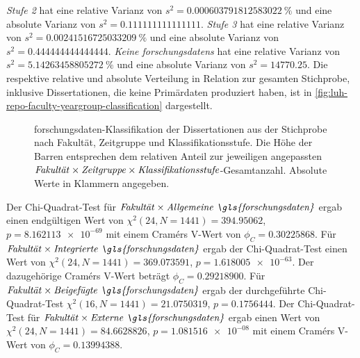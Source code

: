 \textit{Stufe 2} hat eine relative Varianz von $s^2=\SI[round-mode=places,round-precision=3]{0.000603791812583022}{\percent}$ und eine absolute Varianz von $s^2=\num[round-mode=places,round-precision=3]{0.111111111111111}$.
\textit{Stufe 3} hat eine relative Varianz von $s^2=\SI[round-mode=places,round-precision=3]{0.00241516725033209}{\percent}$ und eine absolute Varianz von $s^2=\num[round-mode=places,round-precision=3]{0.444444444444444}$.
\textit{Keine \glspl{forschungsdaten}} hat eine relative Varianz von $s^2=\SI[round-mode=places,round-precision=3]{5.14263458805272}{\percent}$ und eine absolute Varianz von $s^2=\num[round-mode=places,round-precision=3]{14770.25}$.
%
Die respektive relative und absolute Verteilung in Relation zur gesamten Stichprobe, inklusive Dissertationen, die keine Primärdaten produziert haben, ist in \cref{fig:luh-repo-faculty-yeargroup-classification} dargestellt.
\begin{figure}[!htbp]
    \resizebox{\ifdim\width>\textwidth\textwidth\else\width\fi}{!}{}
    \caption{\gls{forschungsdaten}-Klassifikation der Dissertationen aus der Stichprobe nach Fakultät, Zeitgruppe und Klassifikationsstufe.
    Die Höhe der Barren entsprechen dem relativen Anteil zur jeweiligen angepassten $\text{\textit{Fakultät}}\times\text{\textit{Zeitgruppe}}\times\text{\textit{Klassifikationsstufe}}$-Gesamtanzahl.
    Absolute Werte in Klammern angegeben.}
    \label{fig:luh-repo-faculty-yeargroup-classification-adjusted}
\end{figure}

Der Chi-Quadrat-Test für $\text{\textit{Fakultät}}\times\text{\textit{Allgemeine \gls{forschungsdaten}}}$ ergab einen endgültigen Wert von $\chi^2 (\num{24}, N = \num{1441}) = \num[round-mode=places,round-precision=3]{394.95062}$, $p = \num[round-mode=places,round-precision=3]{8.162113e-69}$ mit einem Cramérs V-Wert von $\phi_C=\num[round-mode=places,round-precision=3]{0.30225868}$.
Für $\text{\textit{Fakultät}}\times\text{\textit{Integrierte \gls{forschungsdaten}}}$ ergab der Chi-Quadrat-Test einen Wert von $\chi^2 (\num{24}, N = \num{1441}) = \num[round-mode=places,round-precision=3]{369.073591}$, $p = \num[round-mode=places,round-precision=3]{1.618005e-63}$.
Der dazugehörige Cramérs V-Wert beträgt $\phi_C=\num[round-mode=places,round-precision=3]{0.29218900}$.
Für $\text{\textit{Fakultät}}\times\text{\textit{Beigefügte \gls{forschungsdaten}}}$ ergab der durchgeführte Chi-Quadrat-Test $\chi^2 (\num{16}, N = \num{1441}) = \num[round-mode=places,round-precision=3]{21.0750319}$, $p = \num[round-mode=places,round-precision=3]{0.1756444}$.
Der Chi-Quadrat-Test für $\text{\textit{Fakultät}}\times\text{\textit{Externe \gls{forschungsdaten}}}$ ergab einen Wert von $\chi^2 (\num{24}, N = \num{1441}) = \num[round-mode=places,round-precision=3]{84.6628826}$, $p = \num[round-mode=places,round-precision=3]{1.081516e-08}$ mit einem Cramérs V-Wert von $\phi_C=\num[round-mode=places,round-precision=3]{0.13994388}$.

